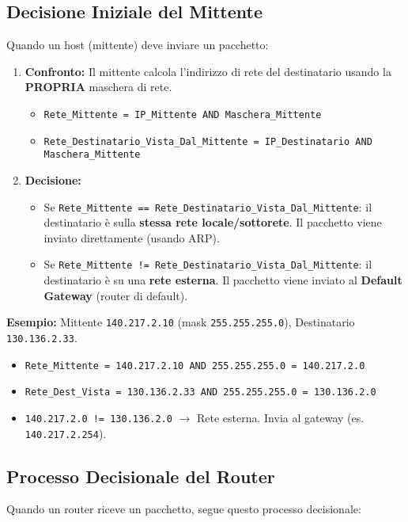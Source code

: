 \subsection{Decisione Iniziale del Mittente}
Quando un host (mittente) deve inviare un pacchetto:
\begin{enumerate}
    \item \textbf{Confronto:} Il mittente calcola l'indirizzo di rete del destinatario usando la \textbf{PROPRIA} maschera di rete.
    \begin{itemize}
        \item \texttt{Rete\_Mittente = IP\_Mittente AND Maschera\_Mittente}
        \item \texttt{Rete\_Destinatario\_Vista\_Dal\_Mittente = IP\_Destinatario AND Maschera\_Mittente}
    \end{itemize}
    \item \textbf{Decisione:}
    \begin{itemize}
        \item Se \texttt{Rete\_Mittente == Rete\_Destinatario\_Vista\_Dal\_Mittente}: il destinatario è sulla \textbf{stessa rete locale/sottorete}. Il pacchetto viene inviato direttamente (usando ARP).
        \item Se \texttt{Rete\_Mittente != Rete\_Destinatario\_Vista\_Dal\_Mittente}: il destinatario è su una \textbf{rete esterna}. Il pacchetto viene inviato al \textbf{Default Gateway} (router di default).
    \end{itemize}
\end{enumerate}
\textbf{Esempio:} Mittente \texttt{140.217.2.10} (mask \texttt{255.255.255.0}), Destinatario \texttt{130.136.2.33}.
\begin{itemize}
    \item \texttt{Rete\_Mittente = 140.217.2.10 AND 255.255.255.0 = 140.217.2.0}
    \item \texttt{Rete\_Dest\_Vista = 130.136.2.33 AND 255.255.255.0 = 130.136.2.0}
    \item \texttt{140.217.2.0 != 130.136.2.0} $\rightarrow$ Rete esterna. Invia al gateway (es. \texttt{140.217.2.254}).
\end{itemize}

\subsection{Processo Decisionale del Router}
Quando un router riceve un pacchetto, segue questo processo decisionale:

